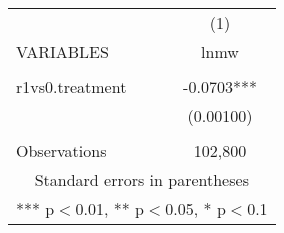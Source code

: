 \begin{tabular}{lc} \hline
 & (1) \\
VARIABLES & lnmw \\ \hline
 &  \\
r1vs0.treatment & -0.0703*** \\
 & (0.00100) \\
 &  \\
 Observations & 102,800 \\ \hline
\multicolumn{2}{c}{ Standard errors in parentheses} \\
\multicolumn{2}{c}{ *** p$<$0.01, ** p$<$0.05, * p$<$0.1} \\
\end{tabular}
